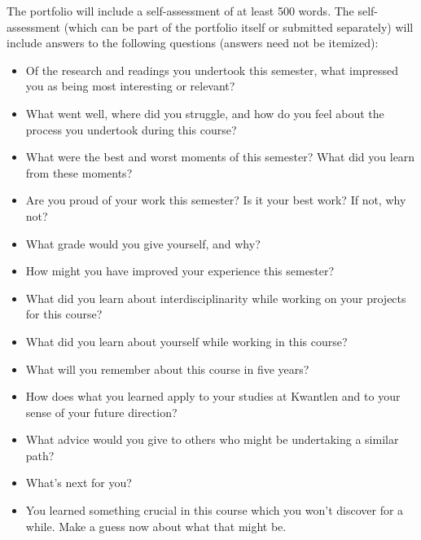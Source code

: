 \documentclass[letterpaper,10pt,headsepline]{scrreprt}
\begin{document}
The portfolio will include a self-assessment of at least 500 words. The self-assessment (which can be part of the portfolio itself or submitted separately) will include answers to the following questions (answers need not be itemized): 

 \begin{itemize}

\item Of the research and readings you undertook this semester, what impressed you as being most interesting or relevant?

\item What went well, where did you struggle, and how do you feel about the process you undertook during this course?

\item What were the best and worst moments of this semester? What did you learn from these moments?

\item Are you proud of your work this semester? Is it your best work? If not, why not?

\item What grade would you give yourself, and why?

\item How might you have improved your experience this semester?

\item What did you learn about interdisciplinarity while working on your projects for this course?

\item What did you learn about yourself while working in this course?

\item What will you remember about this course in five years?

\item How does what you learned apply to your studies at Kwantlen and to your sense of your future direction?

\item What advice would you give to others who might be undertaking a similar path?

\item What's next for you?

\item You learned something crucial in this course which you won't discover for a while. Make a guess now about what that might be.

\end{itemize}
\end{document}
